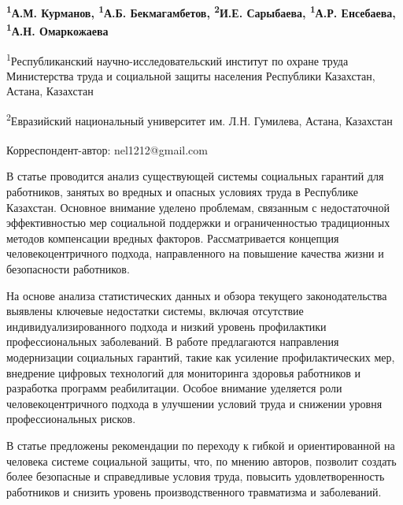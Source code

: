
\begin{articleheader}

{\bfseries \textsuperscript{1}А.М. Курманов, \textsuperscript{1}А.Б.
Бекмагамбетов, \textsuperscript{2}И.Е. Сарыбаева,
\textsuperscript{1}А.Р. Енсебаева\textsuperscript{\envelope },}
{\bfseries \textsuperscript{1}А.Н. Омаркожаева}
\end{articleheader}
\begin{affiliation}

\textsuperscript{1}Республиканский научно-исследовательский институт по
охране труда Министерства труда и социальной защиты населения Республики Казахстан, Астана,
Казахстан

\textsuperscript{2}Евразийский национальный университет им. Л.Н. Гумилева, Астана, Казахстан

\raggedright{\bfseries \textsuperscript{\envelope }}Корреспондент-автор: nel1212@gmail.com
\end{affiliation}

В статье проводится анализ существующей системы социальных гарантий для
работников, занятых во вредных и опасных условиях труда в Республике
Казахстан. Основное внимание уделено проблемам, связанным с
недостаточной эффективностью мер социальной поддержки и ограниченностью
традиционных методов компенсации вредных факторов. Рассматривается
концепция человекоцентричного подхода, направленного на повышение
качества жизни и безопасности работников.

На основе анализа статистических данных и обзора текущего
законодательства выявлены ключевые недостатки системы, включая
отсутствие индивидуализированного подхода и низкий уровень профилактики
профессиональных заболеваний. В работе предлагаются направления
модернизации социальных гарантий, такие как усиление профилактических
мер, внедрение цифровых технологий для мониторинга здоровья работников и
разработка программ реабилитации. Особое внимание уделяется роли
человекоцентричного подхода в улучшении условий труда и снижении уровня
профессиональных рисков.

В статье предложены рекомендации по переходу к гибкой и ориентированной
на человека системе социальной защиты, что, по мнению авторов, позволит
создать более безопасные и справедливые условия труда, повысить
удовлетворенность работников и снизить уровень производственного
травматизма и заболеваний.

